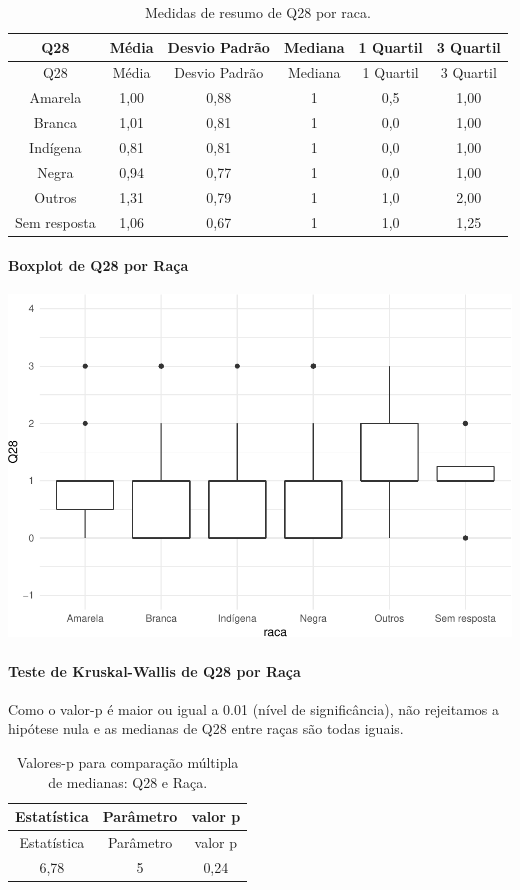 \documentclass[]{article}
\let\oldparagraph\paragraph
\renewcommand{\paragraph}[1]{\oldparagraph{#1}\mbox{}}
\begin{document}
\begin{longtable}[]{@{}cccccc@{}}
\caption{\label{tab:unnamed-chunk-872}Medidas de resumo de Q28 por raca.}\tabularnewline
\toprule
Q28 & Média & Desvio Padrão & Mediana & 1 Quartil & 3 Quartil\tabularnewline
\midrule
\endfirsthead
\toprule
Q28 & Média & Desvio Padrão & Mediana & 1 Quartil & 3 Quartil\tabularnewline
\midrule
\endhead
Amarela & 1,00 & 0,88 & 1 & 0,5 & 1,00\tabularnewline
Branca & 1,01 & 0,81 & 1 & 0,0 & 1,00\tabularnewline
Indígena & 0,81 & 0,81 & 1 & 0,0 & 1,00\tabularnewline
Negra & 0,94 & 0,77 & 1 & 0,0 & 1,00\tabularnewline
Outros & 1,31 & 0,79 & 1 & 1,0 & 2,00\tabularnewline
Sem resposta & 1,06 & 0,67 & 1 & 1,0 & 1,25\tabularnewline
\bottomrule
\end{longtable}

\hypertarget{boxplot-de-q28-por-rauxe7a}{%
\paragraph{Boxplot de Q28 por Raça}\label{boxplot-de-q28-por-rauxe7a}}

\begin{center}\includegraphics[width=0.75\linewidth]{relatorio_covid19_files/figure-latex/unnamed-chunk-873-1} \end{center}

\hypertarget{teste-de-kruskal-wallis-de-q28-por-rauxe7a}{%
\paragraph{Teste de Kruskal-Wallis de Q28 por Raça}\label{teste-de-kruskal-wallis-de-q28-por-rauxe7a}}

Como o valor-p é maior ou igual a 0.01 (nível de significância), não rejeitamos a hipótese nula e as medianas de Q28 entre raças são todas iguais.

\begin{longtable}[]{@{}ccc@{}}
\caption{\label{tab:unnamed-chunk-875}Valores-p para comparação múltipla de medianas: Q28 e Raça.}\tabularnewline
\toprule
Estatística & Parâmetro & valor p\tabularnewline
\midrule
\endfirsthead
\toprule
Estatística & Parâmetro & valor p\tabularnewline
\midrule
\endhead
6,78 & 5 & 0,24\tabularnewline
\bottomrule
\end{longtable}
\end{document}
